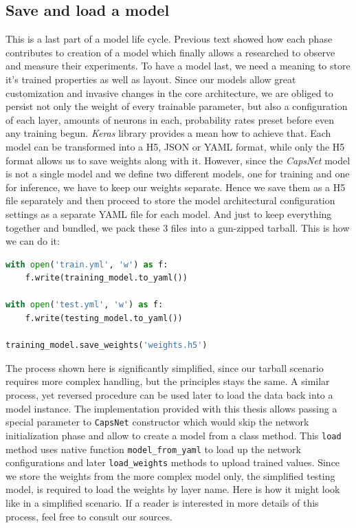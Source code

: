 \subsection{Save and load a model}
\label{ss:save_model}

This is a last part of a model life cycle. Previous text showed how each phase contributes to creation of a model which finally allows a researched to observe and measure their experiments. To have a model last, we need a meaning to store it's trained properties as well as layout. Since our models allow great customization and invasive changes in the core architecture, we are obliged to persist not only the weight of every trainable parameter, but also a configuration of each layer, amounts of neurons in each, probability rates preset before even any training begun. \textit{Keras} library provides a mean how to achieve that. Each model can be transformed into a H5, JSON or YAML format, while only the H5 format allows us to save weights along with it. However, since the \textit{CapsNet} model is not a single model and we define two different models, one for training and one for inference, we have to keep our weights separate. Hence we save them as a H5 file separately and then proceed to store the model architectural configuration settings as a separate YAML file for each model. And just to keep everything together and bundled, we pack these 3 files into a gun-zipped tarball. This is how we can do it:

\begin{lstlisting}[language=Python, caption=Saving a model in \textit{Keras}]
with open('train.yml', 'w') as f:
    f.write(training_model.to_yaml())

with open('test.yml', 'w') as f:
    f.write(testing_model.to_yaml())

training_model.save_weights('weights.h5')
\end{lstlisting}

The process shown here is significantly simplified, since our tarball scenario requires more complex handling, but the principles stays the same. A similar process, yet reversed procedure can be used later to load the data back into a model instance. The implementation provided with this thesis allows passing a special parameter to \texttt{CapsNet} constructor which would skip the network initialization phase and allow to create a model from a class method. This \texttt{load} method uses native function \texttt{model\_from\_yaml} to load up the network configurations and later \texttt{load\_weights} methods to upload trained values. Since we store the weights from the more complex model only, the simplified testing model, is required to load the weights by layer name. Here is how it might look like in a simplified scenario. If a reader is interested in more details of this process, feel free to consult our sources.


